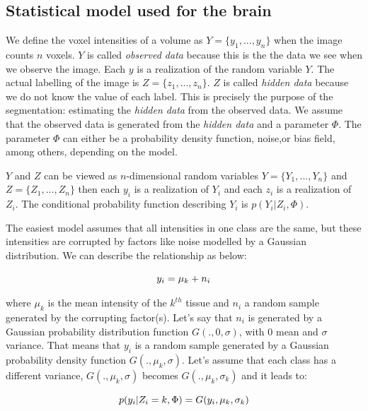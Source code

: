 \subsection{Statistical model used for the brain}
%
We define the voxel intensities of a volume as $Y=\lbrace y_1, ..., y_n\rbrace$ when the image counts $n$ voxels. $Y$ is called \textit{observed data} because this is the the data we see when we observe the image. Each $y$ is a realization of the random variable $Y$. The actual labelling of the image is $Z=\lbrace z_1, ..., z_n\rbrace$. $Z$ is called \textit{hidden data} because we do not know the value of each label. This is precisely the purpose of the segmentation: estimating the \textit{hidden data} from the observed data. We assume that the observed data is generated from the \textit{hidden data} and a parameter $\Phi$. The parameter $\Phi$ can either be a probability density function, noise,or bias field, among others, depending on the model.
\par
$Y$ and $Z$ can be viewed as $n$-dimensional random variables $Y=\lbrace Y_1, ..., Y_n\rbrace$ and $Z=\lbrace Z_1, ..., Z_n\rbrace$ then each $y_i$ is a realization of $Y_i$ and each $z_i$ is a realization of $Z_i$. The conditional probability function describing $Y_i$ is $p(Y_i|Z_i,\Phi)$.
\par
The easiest model assumes that all intensities in one class are the same, but these intensities are corrupted by factors like noise modelled by a Gaussian distribution. We can describe the relationship as below:
  
  \begin{equation*}
  y_i=\mu_k+n_i\\
  \end{equation*}

\par
where $\mu_k$ is the mean intensity of the $k^{th}$ tissue and $n_i$ a random sample generated by the corrupting factor(s). Let's say that $n_i$ is generated by a Gaussian probability distribution function $G(.,0,\sigma)$, with $0$ mean and $\sigma$ variance. That means that $y_i$ is a random sample generated by a Gaussian probability density function $G(.,\mu_k,\sigma)$. Let's assume that each class has a different variance, $G(.,\mu_k,\sigma)$ becomes $G(.,\mu_k,\sigma_k)$ and it leads to:
  
  \begin{equation}\label{CDP}
  p(y_i|Z_i=k,\Phi)=G(y_i,\mu_k,\sigma_k)\\
  \end{equation}

